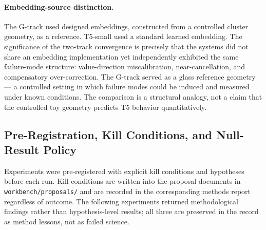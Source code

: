 \paragraph{Embedding-source distinction.}
The G-track used designed embeddings, constructed from a controlled cluster geometry, as a reference.
T5-small used a standard learned embedding.
The significance of the two-track convergence is precisely that the systems did not
share an embedding implementation yet independently exhibited the same failure-mode
structure: value-direction miscalibration, near-cancellation, and compensatory
over-correction. The G-track served as a glass reference geometry --- a controlled
setting in which failure modes could be induced and measured under known conditions.
The comparison is a structural analogy, not a claim that the controlled toy geometry
predicts T5 behavior quantitatively.

\subsection{Pre-Registration, Kill Conditions, and Null-Result Policy}
\label{sec:preregistration}

Experiments were pre-registered with explicit kill conditions and hypotheses before
each run. Kill conditions are written into the proposal documents
in \texttt{workbench/proposals/} and are recorded in the corresponding methods report
regardless of outcome. The following experiments returned methodological findings rather
than hypothesis-level results; all three are preserved in the record as method lessons,
not as failed science.


